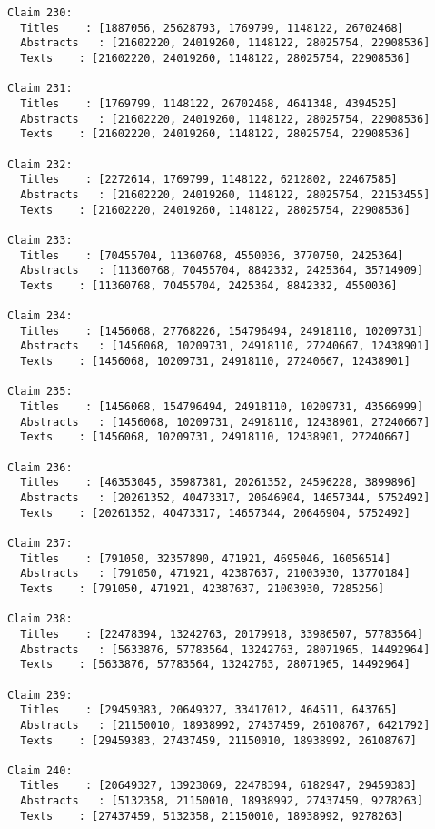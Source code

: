 \documentclass[11pt]{article}
\begin{document}
\begin{Verbatim}[commandchars=\\\{\}]
Claim 230:
  Titles    : [1887056, 25628793, 1769799, 1148122, 26702468]
  Abstracts   : [21602220, 24019260, 1148122, 28025754, 22908536]
  Texts    : [21602220, 24019260, 1148122, 28025754, 22908536]

Claim 231:
  Titles    : [1769799, 1148122, 26702468, 4641348, 4394525]
  Abstracts   : [21602220, 24019260, 1148122, 28025754, 22908536]
  Texts    : [21602220, 24019260, 1148122, 28025754, 22908536]

Claim 232:
  Titles    : [2272614, 1769799, 1148122, 6212802, 22467585]
  Abstracts   : [21602220, 24019260, 1148122, 28025754, 22153455]
  Texts    : [21602220, 24019260, 1148122, 28025754, 22908536]

Claim 233:
  Titles    : [70455704, 11360768, 4550036, 3770750, 2425364]
  Abstracts   : [11360768, 70455704, 8842332, 2425364, 35714909]
  Texts    : [11360768, 70455704, 2425364, 8842332, 4550036]

Claim 234:
  Titles    : [1456068, 27768226, 154796494, 24918110, 10209731]
  Abstracts   : [1456068, 10209731, 24918110, 27240667, 12438901]
  Texts    : [1456068, 10209731, 24918110, 27240667, 12438901]

Claim 235:
  Titles    : [1456068, 154796494, 24918110, 10209731, 43566999]
  Abstracts   : [1456068, 10209731, 24918110, 12438901, 27240667]
  Texts    : [1456068, 10209731, 24918110, 12438901, 27240667]

Claim 236:
  Titles    : [46353045, 35987381, 20261352, 24596228, 3899896]
  Abstracts   : [20261352, 40473317, 20646904, 14657344, 5752492]
  Texts    : [20261352, 40473317, 14657344, 20646904, 5752492]

Claim 237:
  Titles    : [791050, 32357890, 471921, 4695046, 16056514]
  Abstracts   : [791050, 471921, 42387637, 21003930, 13770184]
  Texts    : [791050, 471921, 42387637, 21003930, 7285256]

Claim 238:
  Titles    : [22478394, 13242763, 20179918, 33986507, 57783564]
  Abstracts   : [5633876, 57783564, 13242763, 28071965, 14492964]
  Texts    : [5633876, 57783564, 13242763, 28071965, 14492964]

Claim 239:
  Titles    : [29459383, 20649327, 33417012, 464511, 643765]
  Abstracts   : [21150010, 18938992, 27437459, 26108767, 6421792]
  Texts    : [29459383, 27437459, 21150010, 18938992, 26108767]

Claim 240:
  Titles    : [20649327, 13923069, 22478394, 6182947, 29459383]
  Abstracts   : [5132358, 21150010, 18938992, 27437459, 9278263]
  Texts    : [27437459, 5132358, 21150010, 18938992, 9278263]


\end{Verbatim}
\end{document}
